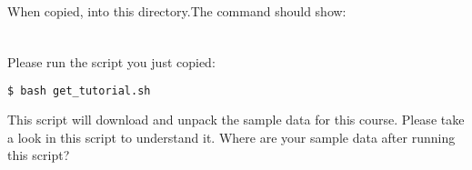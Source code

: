 \begin{frame}[fragile]
  \frametitle{}
  \begin{columns}[t]
	 \begin{column}{.5\textwidth}
		When copied,  into this directory.\newline The command  should show:
	 \end{column}
	 \begin{column}{.5\textwidth}
	   \begin{minipage}[t]{0.5\textwidth}
		 {\footnotesize \DTsetlength{0.2em}{1em}{0.2em}{0.4pt}{.6pt}
			 }
      \end{minipage}
	\end{column}
  \end{columns}
\end{frame}

\begin{frame}[fragile]
	\frametitle{}
	Please run the  script you just copied:
	\begin{lstlisting}[language=Bash, style=Shell,basicstyle=\footnotesize]
$ bash get_tutorial.sh
	\end{lstlisting}
	\begin{task}
		This script will download and unpack the sample data for this course. Please take a look in this script to understand it. Where are your sample data after running this script?
	\end{task}
\end{frame}
